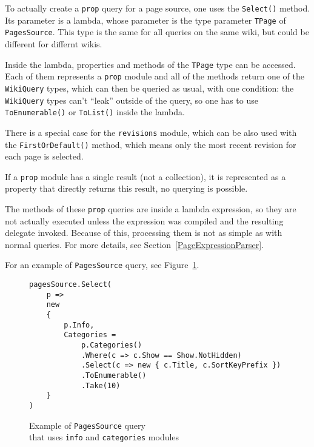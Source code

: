 \medskip

To actually create a \texttt{prop} query for a page source, one uses the \lstinline{Select()} method.
Its parameter is a lambda, whose parameter is the type parameter \lstinline{TPage} of \lstinline{PagesSource}.
This type is the same for all queries on the same wiki, but could be different for differnt wikis.

Inside the lambda, properties and methods of the \lstinline{TPage} type can be accessed.
Each of them represents a \texttt{prop} module and all of the methods return one of the \lstinline{WikiQuery} types,
which can then be queried as usual, with one condition:
the \lstinline{WikiQuery} types can't ``leak'' outside of the query, so one has to use \lstinline{ToEnumerable()} or \lstinline{ToList()} inside the lambda.

There is a special case for the \texttt{revisions} module,
which can be also used with the \lstinline{FirstOrDefault()} method,
which means only the most recent revision for each page is selected.

If a \texttt{prop} module has a single result (not a collection), it is represented as a property
that directly returns this result, no querying is possible.

\medskip

The methods of these \texttt{prop} queries are inside a lambda expression,
so they are not actually executed unless the expression was compiled and the resulting delegate invoked.
Because of this, processing them is not as simple as with normal queries.
For more details, see Section~\ref{PageExpressionParser}.

\medskip

For an example of \lstinline{PagesSource} query, see Figure~\ref{PS query}.

\begin{figure}[htbp]

\begin{lstlisting}
pagesSource.Select(
    p =>
    new
    {
        p.Info,
        Categories =
            p.Categories()
            .Where(c => c.Show == Show.NotHidden)
            .Select(c => new { c.Title, c.SortKeyPrefix })
            .ToEnumerable()
            .Take(10)
	}
)
\end{lstlisting}

\caption{Example of \lstinline{PagesSource} query \\ that uses \texttt{info} and \texttt{categories} modules}
\label{PS query}

\end{figure}

